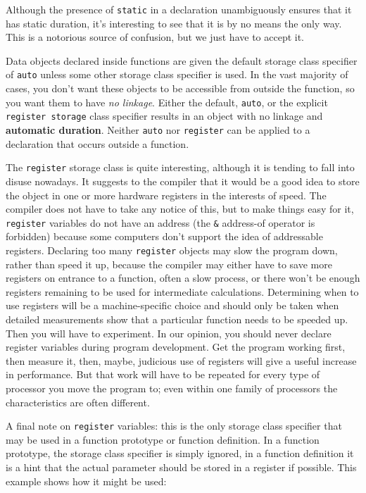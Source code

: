     Although the presence of \texttt{static} in a declaration
     unambiguously ensures that it has static duration, it's interesting to
     see that it is by no means the only way. This is a notorious source of
     confusion, but we just have to accept it.


    Data objects declared inside functions are given the default storage
     class specifier of \texttt{auto} unless some other storage class
     specifier is used. In the vast majority of cases, you don't want these
     objects to be accessible from outside the function, so you want them to
     have \textit{no linkage}. Either the default, \texttt{auto}, or the
     explicit \texttt{register storage} class specifier results in an
     object with no linkage and \textbf{automatic duration}. Neither
     \texttt{auto} nor \texttt{register} can be applied to
     a declaration that occurs outside a function.


    The \texttt{register} storage class is quite interesting,
     although it is tending to fall into disuse nowadays. It suggests to the
     compiler that it would be a good idea to store the object in one or
     more hardware registers in the interests of speed. The compiler does
     not have to take any notice of this, but to make things easy for it,
     \texttt{register} variables do not have an address (the
     \texttt{\&} address-of operator is forbidden) because some
     computers don't support the idea of addressable registers. Declaring
     too many \texttt{register} objects may slow the program down,
     rather than speed it up, because the compiler may either have to save
     more registers on entrance to a function, often a slow process, or
     there won't be enough registers remaining to be used for intermediate
     calculations. Determining when to use registers will be
     a machine-specific choice and should only be taken when detailed
     measurements show that a particular function needs to be speeded up.
     Then you will have to experiment. In our opinion, you should never
     declare register variables during program development. Get the program
     working first, then measure it, then, maybe, judicious use of registers
     will give a useful increase in performance. But that work will have to
     be repeated for every type of processor you move the program to; even
     within one family of processors the characteristics are often
     different.


    A final note on \texttt{register} variables: this is the only
     storage class specifier that may be used in a function prototype or
     function definition. In a function prototype, the storage class
     specifier is simply ignored, in a function definition it is a hint that
     the actual parameter should be stored in a register if possible. This
     example shows how it might be used:


